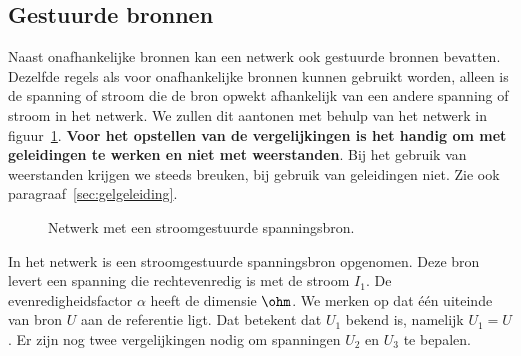 \subsection{Gestuurde bronnen}
Naast onafhankelijke bronnen kan een netwerk ook gestuurde bronnen bevatten. Dezelfde regels als voor onafhankelijke bronnen kunnen gebruikt worden, alleen is de spanning of stroom die de bron opwekt afhankelijk van een andere spanning of stroom in het netwerk. We zullen dit aantonen met behulp van het netwerk in figuur~\ref{fig:gelnetwerkmetccvs}. \textbf{Voor het opstellen van de vergelijkingen is het handig om met geleidingen te werken en niet met weerstanden}. Bij het gebruik van weerstanden krijgen we steeds breuken, bij gebruik van geleidingen niet. Zie ook paragraaf~\ref{sec:gelgeleiding}.

\begin{figure}[H]
\centering
{}
\caption{Netwerk met een stroomgestuurde spanningsbron.}
\label{fig:gelnetwerkmetccvs}
\end{figure}

In het netwerk is een stroomgestuurde spanningsbron opgenomen. Deze bron levert een spanning die rechtevenredig is met de stroom $I_1$. De evenredigheidsfactor $\alpha$ heeft de dimensie $\ohm$. 
We merken op dat \'e\'en uiteinde van bron $U$ aan de referentie ligt. Dat betekent dat $U_1$ bekend is, namelijk $U_1=U$. Er zijn nog twee vergelijkingen nodig om spanningen $U_2$ en $U_3$ te bepalen.

